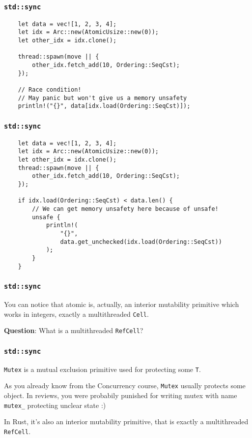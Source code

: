 \documentclass[aspectratio=1610,t]{beamer}
\begin{document}

\begin{frame}[fragile]
\frametitle{\texttt{std::sync}}
\begin{verbatim}
    let data = vec![1, 2, 3, 4];
    let idx = Arc::new(AtomicUsize::new(0));
    let other_idx = idx.clone();

    thread::spawn(move || {
        other_idx.fetch_add(10, Ordering::SeqCst);
    });

    // Race condition!
    // May panic but won't give us a memory unsafety
    println!("{}", data[idx.load(Ordering::SeqCst)]);
\end{verbatim}
\end{frame}


\begin{frame}[fragile]
\frametitle{\texttt{std::sync}}
\begin{verbatim}
    let data = vec![1, 2, 3, 4];
    let idx = Arc::new(AtomicUsize::new(0));
    let other_idx = idx.clone();
    thread::spawn(move || {
        other_idx.fetch_add(10, Ordering::SeqCst);
    });

    if idx.load(Ordering::SeqCst) < data.len() {
        // We can get memory unsafety here because of unsafe!
        unsafe {
            println!(
                "{}",
                data.get_unchecked(idx.load(Ordering::SeqCst))
            );
        }
    }
\end{verbatim}
\end{frame}


\begin{frame}[fragile]
\frametitle{\texttt{std::sync}}
You can notice that atomic is, actually, an interior mutability primitive which works in integers, exactly a multithreaded \texttt{Cell}.

\textbf{Question}: What is a multithreaded \texttt{RefCell}?
\end{frame}


\begin{frame}[fragile]
\frametitle{\texttt{std::sync}}
\texttt{Mutex} is a mutual exclusion primitive used for protecting some \texttt{T}.

As you already know from the Concurrency course, \texttt{Mutex} usually protects some object. In reviews, you were probabily punished for writing mutex with name \texttt{mutex\_} protecting unclear state :)

In Rust, it's also an interior mutability primitive, that is exactly a multithreaded \texttt{RefCell}.
\end{frame}
\end{document}

